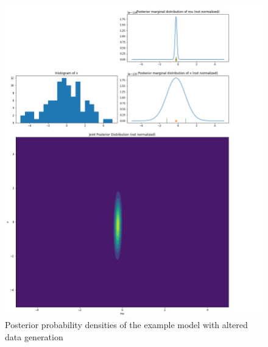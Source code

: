 \documentclass{article}
\begin{document}
\begin{figure}
	\includegraphics[width=\textwidth]{images/ground_truth_posterior_6_cut.png}
	\caption[Posterior probability densities of the example model with altered data generation]{Posterior probability densities of the example model with altered data generation}
	\label{fig:ground_truth_posterior_6}
\end{figure}
\FloatBarrier
\end{document}
